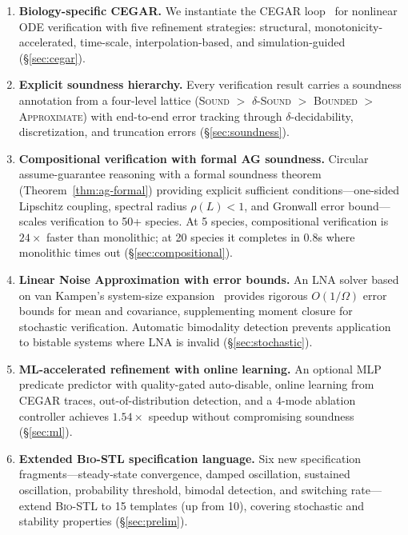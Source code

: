 \documentclass[11pt]{article}
\newcommand{\cegar}{\textsc{CEGAR}}
\newcommand{\biostl}{\textsc{Bio-STL}}
\begin{document}
\begin{enumerate}[leftmargin=*,itemsep=2pt]
\item \textbf{Biology-specific \cegar{}.} We instantiate the \cegar{}
  loop~\cite{clarke2000cegar} for nonlinear ODE verification with
  five refinement strategies: structural, monotonicity-accelerated,
  time-scale, interpolation-based, and simulation-guided
  (\S\ref{sec:cegar}).

\item \textbf{Explicit soundness hierarchy.} Every verification
  result carries a soundness annotation from a four-level lattice
  (\textsc{Sound} $>$ \textsc{$\delta$-Sound} $>$ \textsc{Bounded}
  $>$ \textsc{Approximate}) with end-to-end error tracking through
  $\delta$-decidability, discretization, and truncation errors
  (\S\ref{sec:soundness}).

\item \textbf{Compositional verification with formal AG soundness.}
  Circular assume-guarantee reasoning with a formal soundness
  theorem (Theorem~\ref{thm:ag-formal}) providing explicit
  sufficient conditions---one-sided Lipschitz coupling, spectral
  radius $\rho(L) < 1$, and Gronwall error bound---scales
  verification to 50+ species. At 5 species, compositional
  verification is $24\times$ faster than monolithic; at 20 species
  it completes in 0.8s where monolithic times out
  (\S\ref{sec:compositional}).

\item \textbf{Linear Noise Approximation with error bounds.}
  An LNA solver based on van Kampen's system-size
  expansion~\cite{vankampen2007stochastic} provides rigorous
  $O(1/\Omega)$ error bounds for mean and covariance, supplementing
  moment closure for stochastic verification. Automatic bimodality
  detection prevents application to bistable systems where LNA is
  invalid (\S\ref{sec:stochastic}).

\item \textbf{ML-accelerated refinement with online learning.}
  An optional MLP predicate predictor with quality-gated
  auto-disable, online learning from \cegar{} traces,
  out-of-distribution detection, and a 4-mode ablation controller
  achieves $1.54\times$ speedup without compromising soundness
  (\S\ref{sec:ml}).

\item \textbf{Extended \biostl{} specification language.} Six new
  specification fragments---steady-state convergence, damped
  oscillation, sustained oscillation, probability threshold, bimodal
  detection, and switching rate---extend \biostl{} to 15 templates
  (up from 10), covering stochastic and stability properties
  (\S\ref{sec:prelim}).


\end{enumerate}
\end{document}
